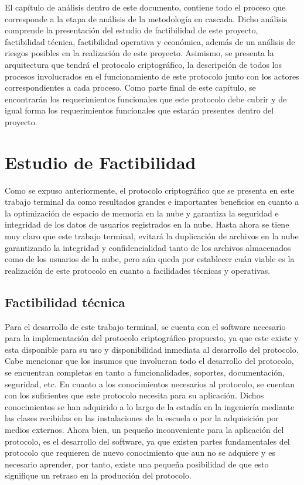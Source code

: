 
El capítulo de análisis dentro de este documento, contiene todo el proceso que corresponde a la etapa de análisis de la metodología en cascada. Dicho análisis comprende la presentación del estudio de factibilidad de este proyecto, factibilidad técnica, factibilidad operativa y económica, además de un análisis de riesgos posibles en la realización de este proyecto. Asimismo, se presenta la arquitectura que tendrá el protocolo criptográfico, la descripción de todos los procesos involucrados en el funcionamiento de este protocolo junto con los actores correspondientes a cada proceso. Como parte final de este capítulo, se encontrarán los requerimientos funcionales que este protocolo debe cubrir y de igual forma los requerimientos funcionales que estarán presentes dentro del proyecto. 


\section{Estudio de Factibilidad}

Como se expuso anteriormente, el protocolo criptográfico que se presenta en este trabajo terminal da como resultados grandes e importantes beneficios en cuanto a la optimización de espacio de memoria en la nube y garantiza la seguridad e integridad de los datos de usuarios registrados en la nube. Hasta ahora se tiene muy claro que este trabajo terminal, evitará la duplicación de archivos en la nube garantizando la integridad y confidencialidad tanto de los archivos almacenados como de los usuarios de la nube, pero aún queda por establecer cuán viable es la realización de este protocolo en cuanto a facilidades técnicas y operativas.


\subsection{Factibilidad técnica}

Para el desarrollo de este trabajo terminal, se cuenta con el software necesario para la implementación del protocolo criptográfico propuesto, ya que este existe y esta disponible para su uso y disponibilidad inmediata al desarrollo del protocolo. Cabe mencionar que los insumos que involucran todo el desarrollo del protocolo, se encuentran completas en tanto a funcionalidades, soportes, documentación, seguridad, etc. 
En cuanto a los conocimientos necesarios al protocolo, se cuentan con los suficientes que este protocolo necesita para su aplicación. Dichos conocimientos se han adquirido a lo largo de la estadía en la ingeniería mediante las clases recibidas en las instalaciones de la escuela o por la adquisición por medios externos. Ahora bien, un pequeño inconveniente para la aplicación del protocolo, es el desarrollo del software, ya que existen partes fundamentales del protocolo que requieren de nuevo conocimiento que aun no se adquiere y es necesario aprender, por tanto, existe una pequeña posibilidad de que esto signifique un retraso en la producción del protocolo. 

